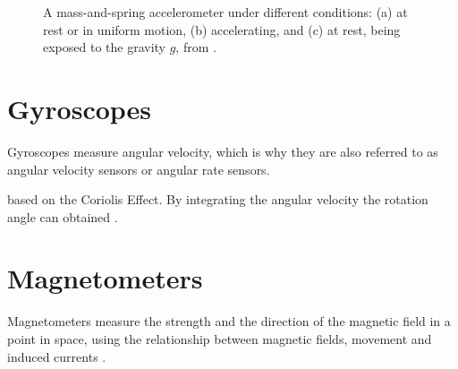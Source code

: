 \begin{figure}
\centering
{}
\caption{A mass-and-spring accelerometer under different conditions: (a) at rest or in uniform motion, (b) accelerating, and (c) at rest, being exposed to the gravity $g$, from \cite{bhattacharyya_inertial_sensors_applications_13}.}
	\label{fig:accelerometer}
\end{figure}


\section{Gyroscopes}

Gyroscopes measure angular velocity, which is why they are also referred to as angular velocity sensors or angular rate sensors.

based on the Coriolis Effect. By integrating the angular velocity the rotation angle can obtained \cite{olivares_vicente_signal_2013}.

\section{Magnetometers}

Magnetometers measure the strength and the direction of the magnetic field in a point in space, using the relationship between magnetic fields, movement and induced currents \cite{olivares_vicente_signal_2013}.

